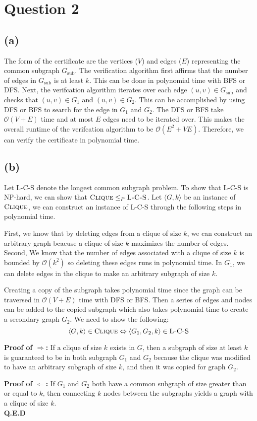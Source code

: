 \section{Question 2}
\subsection{(a)}
The form of the certificate are the vertices ($V$) and edges ($E$) representing the common subgraph $G_{\text{sub}}$.
The verification algorithm first affirms that the number of edges in $G_{\text{sub}}$ is at least $k$.
This can be done in polynomial time with BFS or DFS.
Next, the verifcation algorithm iterates over each edge $(u, v) \in G_{\text{sub}}$ and checks that $(u, v) \in G_1$ and $(u, v) \in G_2$.
This can be accomplished by using DFS or BFS to search for the edge in $G_1$ and $G_2$.
The DFS or BFS take $\mathcal{O}(V + E)$ time and at most $E$ edges need to be iterated over.
This makes the overall runtime of the verifcation algorithm to be $\mathcal{O}(E^2 + VE)$.
Therefore, we can verify the certificate in polynomial time.
\subsection{(b)}
Let \textsc{L-C-S} denote the longest common subgraph problem.
To show that \textsc{L-C-S} is NP-hard, we can show that $\textsc{Clique} \leq_P \textsc{L-C-S}$.
Let $\langle G, k \rangle$ be an instance of $\textsc{Clique}$,
we can construct an instance of \textsc{L-C-S} through
the following steps in polynomial time.

First, we know that by deleting edges from a clique of size $k$,
we can construct an arbitrary graph beacuse a clique of size $k$ maximizes
the number of edges. Second, We know that the number of
edges associated with a clique of size $k$ is bounded by $\mathcal{O}(k^2)$
so deleting these edges runs in polynomial time. In $G_1$,
we can delete edges in the clique to make an arbitrary subgraph of size $k$.

Creating a copy of the subgraph takes polynomial time since the graph can be
traversed in  $\mathcal{O}(V + E)$ time with DFS or BFS. Then a series of edges and nodes
can be added to the copied subgraph which also takes polynomial time to create a secondary
graph $G_2$. We need to show the following:
\[\langle G, k \rangle \in \textsc{Clique} \Leftrightarrow \langle G_1, G_2, k \rangle \in \textsc{L-C-S}\]

\textbf{Proof of $\Rightarrow$:}
If a clique of size $k$ exists in $G$, then a subgraph of size at least $k$ is guaranteed to be
in both subgraph $G_1$ and $G_2$ because the clique was modified to have an arbitrary subgraph of size $k$,
and then it was copied for graph $G_2$.

\textbf{Proof of $\Leftarrow$:}
If $G_1$ and $G_2$ both have a common subgraph of size greater than or equal to $k$, then connecting $k$ nodes between the subgraphs
yields a graph with a clique of size $k$. \\

\textbf{Q.E.D}
